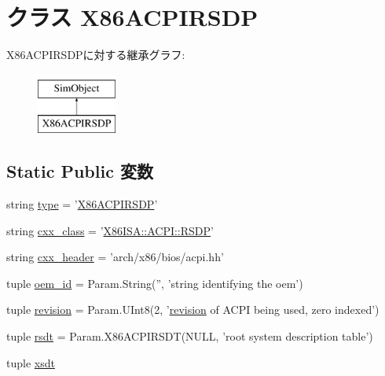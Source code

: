 \hypertarget{classACPI_1_1X86ACPIRSDP}{
\section{クラス X86ACPIRSDP}
\label{classACPI_1_1X86ACPIRSDP}
}
X86ACPIRSDPに対する継承グラフ:\begin{figure}[H]
\begin{center}
\leavevmode
\includegraphics[height=2cm]{classACPI_1_1X86ACPIRSDP}
\end{center}
\end{figure}
\subsection*{Static Public 変数}
\begin{DoxyCompactItemize}
\item 
string \hyperlink{classACPI_1_1X86ACPIRSDP_acce15679d830831b0bbe8ebc2a60b2ca}{type} = '\hyperlink{classACPI_1_1X86ACPIRSDP}{X86ACPIRSDP}'
\item 
string \hyperlink{classACPI_1_1X86ACPIRSDP_a58cd55cd4023648e138237cfc0822ae3}{cxx\_\-class} = '\hyperlink{classX86ISA_1_1ACPI_1_1RSDP}{X86ISA::ACPI::RSDP}'
\item 
string \hyperlink{classACPI_1_1X86ACPIRSDP_a17da7064bc5c518791f0c891eff05fda}{cxx\_\-header} = 'arch/x86/bios/acpi.hh'
\item 
tuple \hyperlink{classACPI_1_1X86ACPIRSDP_a92058ac009c691aede73e4bf13dbbb94}{oem\_\-id} = Param.String('', 'string identifying the oem')
\item 
tuple \hyperlink{classACPI_1_1X86ACPIRSDP_aa5f21ab34557fa5c1d83479fc4e19d4f}{revision} = Param.UInt8(2, '\hyperlink{classACPI_1_1X86ACPIRSDP_aa5f21ab34557fa5c1d83479fc4e19d4f}{revision} of ACPI being used, zero indexed')
\item 
tuple \hyperlink{classACPI_1_1X86ACPIRSDP_ab98cff471d0812ee1b505d0878958ff0}{rsdt} = Param.X86ACPIRSDT(NULL, 'root system description table')
\item 
tuple \hyperlink{classACPI_1_1X86ACPIRSDP_ab79faf67e4a4a3df8b1f5a32cd623f2d}{xsdt}
\end{DoxyCompactItemize}


